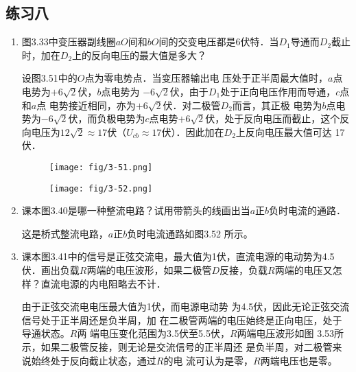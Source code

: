 \subsection{练习八}
\begin{enumerate}
	\item 图3.33中变压器副线圈$aO$间和$bO$间的交变电压都是6伏特．当$D_1$导通而$D_2$截止时，加在$D_2$上的反向电压的最大值是多大？

    \begin{solution}
设图3.51中的$O$点为零电势点．当变压器输出电
压处于正半周最大值时，$a$点电势为$+6\sqrt{2}$伏，$b$点电势为
$-6\sqrt{2}$伏，由于$D_1$处于正向电压作用而导通，$c$点和$a$点
电势接近相同，亦为$+6\sqrt{2}$伏．对二极管$D_2$而言，其正极
电势为$b$点电势为$-6\sqrt{2}$伏，而负极电势为$c$点电势$+6\sqrt{2}$伏，处于反向电压而截止，这个反向电压为$12\sqrt{2}\approx 17$伏（$U_{cb}\approx 17$伏）．因此加在$D_2$上反向电压最大值可达
17伏．
    \end{solution}

\begin{figure}[htp]\centering
    \begin{minipage}[t]{0.48\textwidth}
    \centering
\texttt{[image: fig/3-51.png]}
    \caption{}
    \end{minipage}
    \begin{minipage}[t]{0.48\textwidth}
    \centering
\texttt{[image: fig/3-52.png]}
    \caption{}
    \end{minipage}
    \end{figure}

	\item 课本图3.40是哪一种整流电路？试用带箭头的线画出当$a$正$b$负时电流的通路．

    \begin{solution}
        这是桥式整流电路，$a$正$b$负时电流通路如图3.52
        所示。
    \end{solution}
    
	\item 课本图3.41中的信号是正弦交流电，最大值为1伏，直流电源的电动势为4.5伏．画出负载$R$两端的电压波形，如果二极管$D$反接，负载$R$两端的电压又怎样？直流电源的内电阻略去不计．

\begin{solution}
    由于正弦交流电电压最大值为1伏，而电源电动势
为4.5伏，因此无论正弦交流信号处于正半周还是负半周，加
在二极管两端的电压始终是正向电压，处于导通状态。$R$两
端电压变化范围为3.5伏至5.5伏，$R$两端电压波形如图
3.53所示，如果二极管反接，则无论是交流信号的正半周还
是负半周，对二极管来说始终处于反向截止状态，通过$R$的电
流可认为是零，$R$两端电压也是零。
\begin{figure}[htp]
    \centering
{}
\end{figure}
\end{solution}
\end{enumerate}
